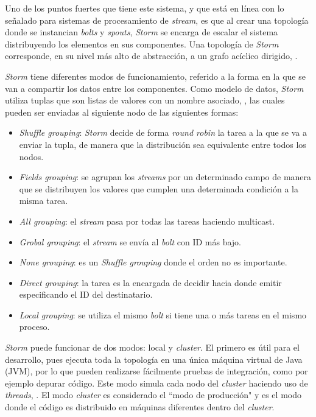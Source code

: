 Uno de los puntos fuertes que tiene este sistema, y que está en línea con lo señalado para sistemas de procesamiento de \textit{stream}, es que al crear una topología donde se instancian \textit{bolts} y \textit{spouts}, \textit{Storm} se encarga de escalar el sistema distribuyendo los elementos en sus componentes. Una topología de \textit{Storm} corresponde, en su nivel más alto de abstracción, a un grafo acíclico dirigido, \citep{Storm}.

\textit{Storm} tiene diferentes modos de funcionamiento, referido a la forma en la que se van a compartir los datos entre los componentes. Como modelo de datos, \textit{Storm} utiliza tuplas que son listas de valores con un nombre asociado, \citep{Storm}, las cuales pueden ser enviadas al siguiente nodo de las siguientes formas:

\begin{itemize}
\item \textit{Shuffle grouping}: \textit{Storm} decide de forma \textit{round robin} la tarea a la que se va a enviar la tupla, de manera que la distribución sea equivalente entre todos los nodos.
\item \textit{Fields grouping}: se agrupan los \textit{streams} por un determinado campo de manera que se distribuyen los valores que cumplen una determinada condición a la misma tarea.
\item \textit{All grouping}: el \textit{stream} pasa por todas las tareas haciendo multicast.
\item \textit{Grobal grouping}: el \textit{stream} se envía al \textit{bolt} con ID más bajo.
\item \textit{None grouping}: es un \textit{Shuffle grouping} donde el orden no es importante.
\item \textit{Direct grouping}: la tarea es la encargada de decidir hacia donde emitir especificando el ID del destinatario.
\item \textit{Local grouping}: se utiliza el mismo \textit{bolt} si tiene una o más tareas en el mismo proceso.
\end{itemize}

\textit{Storm} puede funcionar de dos modos: local y \textit{cluster}. El primero es útil para el desarrollo, pues ejecuta toda la topología en una única máquina virtual de Java (JVM), por lo que pueden realizarse fácilmente pruebas de integración, como por ejemplo depurar código. Este modo simula cada nodo del \textit{cluster} haciendo uso de \textit{threads}, \citep{Storm}. El modo \textit{cluster} es considerado el ``modo de producción" y es el modo donde el código es distribuido en máquinas diferentes dentro del \textit{cluster}.

